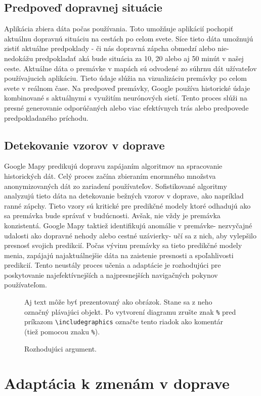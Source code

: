 \documentclass[10pt,twoside,slovak,a4paper]{article}
\begin{document}
\subsection{Predpoveď dopravnej situácie}
Aplikácia zbiera dáta počas používania. Toto umožňuje aplikácií pochopiť aktuálnu dopravnú situáciu na cestách po celom svete. Síce tieto dáta umožnujú zistiť aktuálne predpoklady - či nás dopravná zápcha obmedzí alebo nie- nedokážu predpokladať aká bude situácia za 10, 20 alebo aj 50 minút v našej ceste. 
Aktuálne dáta o premávke v mapách sú odvodené zo súhrnu dát užívateľov používajucich aplikáciu. Tieto údaje slúžia na vizualizáciu premávky po celom svete v reálnom čase. Na predpoveď premávky, Google používa historické údaje kombinované s aktuálnymi s využitím neurónových sietí. Tento proces slúži na presné generovanie odporúčaných alebo viac efektívnych trás alebo predpovede predpokladaného príchodu.
\subsection{Detekovanie vzorov v doprave}
Google Mapy predikujú dopravu zapájaním algoritmov na spracovanie historických dát. Celý proces začína zbieraním enormného množstva anonymizovaných dát zo zariadení používateľov. Sofistikované algoritmy analyzujú tieto dáta na detekovanie bežných vzorov v doprave, ako napríklad ranné zápchy. Tieto vzory sú kritické pre predikčné modely ktoré odhadujú ako sa premávka bude správať v budúcnosti.
Avšak, nie vždy je premávka konzistentá. Google Mapy taktiež identifikujú anomálie v premávke- nezvyčajné udalosti ako dopravné nehody alebo cestné uzávierky- učí sa z nich, aby vylepšilo presnosť svojich predikcií. Počas vývinu premávky sa tieto predikčné modely menia, zapájajú najaktuálnejšie dáta na zaistenie presnosti a spoľahlivosti predikcií. Tento neustály proces učenia a adaptácie je rozhodujúci pre poskytovanie najefektívnejších a najpresnejších navigačných pokynov používateľom.



\begin{figure}[tbh]
\centering
Aj text môže byť prezentovaný ako obrázok. Stane sa z neho označný plávajúci objekt. Po vytvorení diagramu zrušte znak \texttt{\%} pred príkazom \verb|\includegraphics| označte tento riadok ako komentár (tiež pomocou znaku \texttt{\%}).
\caption{Rozhodujúci argument.}
\label{f:rozhod}
\end{figure}
\section{Adaptácia k zmenám v doprave}
\end{document}
